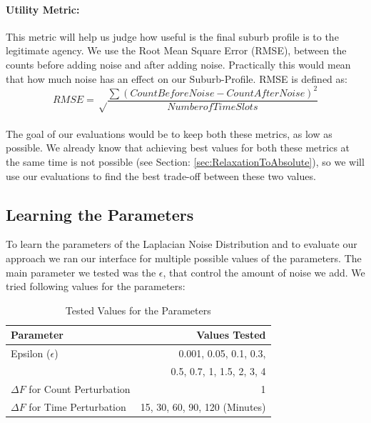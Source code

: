 \documentclass[12pt]{report}
\theoremstyle{named}
\begin{document}
\paragraph{\textbf{Utility Metric:}} This metric will help us judge how useful is the final suburb profile is to the legitimate agency. We use the Root Mean Square Error (RMSE), between the counts before adding noise and after adding noise. Practically this would mean that how much noise has an effect on our Suburb-Profile. RMSE is defined as:
\[RMSE = \sqrt\frac{\sum (CountBefore Noise - CountAfterNoise)^{2}}{Number of TimeSlots}\]

\paragraph{}
The goal of our evaluations would be to keep both these metrics, as low as possible. We already know that achieving best values for both these metrics at the same time is not possible (see Section: \ref{sec:RelaxationToAbsolute}), so we will use our evaluations to find the best trade-off between these two values.



\subsection{Learning the Parameters}
To learn the parameters of the Laplacian Noise Distribution and to evaluate our approach we ran our interface for multiple possible values of the parameters. The main parameter we tested was the $\epsilon$, that control the amount of noise we add. We tried following values for the parameters:

\begin{table}[ht]
\centering
\begin{tabular}{@{}lr@{}}
\toprule
\textbf{Parameter} & \textbf{Values Tested} \\ \midrule
Epsilon ($\epsilon$) & 0.001, 0.05, 0.1, 0.3, \\
 & 0.5, 0.7, 1, 1.5, 2, 3, 4 \\
$\Delta F$ for Count Perturbation & 1 \\
$\Delta F$ for Time Perturbation & 15, 30, 60, 90, 120 (Minutes) \\ \bottomrule
\end{tabular}
\caption{Tested Values for the Parameters}
\label{tab:parametersTested}
\end{table}
\end{document}
